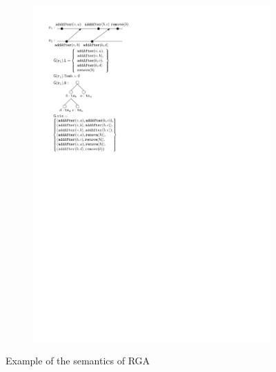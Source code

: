 \begin{figure}[t]
\begin{subfigure}[!ht]{.3\linewidth}
    \includegraphics[scale=.7]{figures/LinRGA-3}
    \caption{}
    \label{fig:rga-sem-3}
  \end{subfigure}
  \caption{Example of the semantics of RGA }
  \label{fig:rga-sem}
\end{figure}

